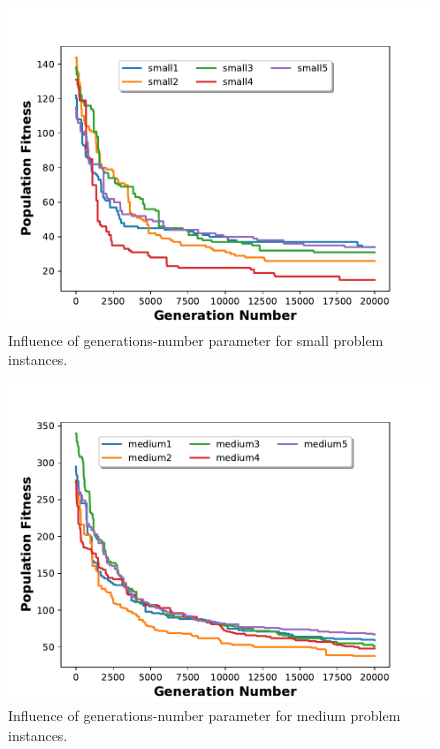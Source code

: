 \begin{figure}[h]
\centering
\includegraphics[height=0.30\textheight]{figures/small_generation.pdf}
\caption{Influence of generations-number parameter for small problem instances.}%
\label{fig:smallg}%
\end{figure}

\begin{figure}[h]
\centering
\includegraphics[height=0.30\textheight]{figures/medium_generation.pdf}
\caption{Influence of generations-number parameter for medium problem instances.}%
\label{fig:mediumg}%
\end{figure}

